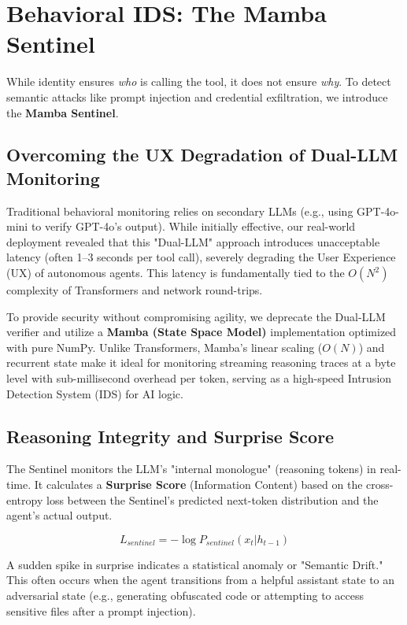\documentclass[conference]{IEEEtran}
\begin{document}
\section{Behavioral IDS: The Mamba Sentinel}
While identity ensures \textit{who} is calling the tool, it does not ensure \textit{why}. To detect semantic attacks like prompt injection and credential exfiltration, we introduce the \textbf{Mamba Sentinel}.

\subsection{Overcoming the UX Degradation of Dual-LLM Monitoring}
Traditional behavioral monitoring relies on secondary LLMs (e.g., using GPT-4o-mini to verify GPT-4o's output). While initially effective, our real-world deployment revealed that this "Dual-LLM" approach introduces unacceptable latency (often 1--3 seconds per tool call), severely degrading the User Experience (UX) of autonomous agents. This latency is fundamentally tied to the $O(N^2)$ complexity of Transformers and network round-trips.

To provide security without compromising agility, we deprecate the Dual-LLM verifier and utilize a \textbf{Mamba (State Space Model)} implementation \cite{mamba2023} optimized with pure NumPy. Unlike Transformers, Mamba's linear scaling ($O(N)$) and recurrent state make it ideal for monitoring streaming reasoning traces at a byte level with sub-millisecond overhead per token, serving as a high-speed Intrusion Detection System (IDS) for AI logic.

\subsection{Reasoning Integrity and Surprise Score}
The Sentinel monitors the LLM's "internal monologue" (reasoning tokens) in real-time. It calculates a \textbf{Surprise Score} (Information Content) based on the cross-entropy loss between the Sentinel's predicted next-token distribution and the agent's actual output.

\begin{equation}
L_{sentinel} = -\log P_{sentinel}(x_t | h_{t-1})
\end{equation}

A sudden spike in surprise indicates a statistical anomaly or "Semantic Drift." This often occurs when the agent transitions from a helpful assistant state to an adversarial state (e.g., generating obfuscated code or attempting to access sensitive files after a prompt injection).
\end{document}
